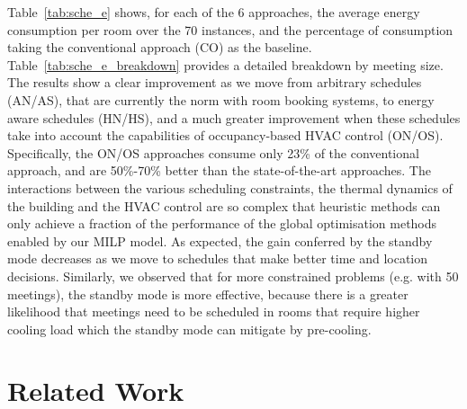 Table~\ref{tab:sche_e} shows, for each of the 6 approaches, the average energy consumption per room over the 70 instances, and the percentage of consumption taking the conventional approach (CO) as the baseline. Table~\ref{tab:sche_e_breakdown} provides a detailed breakdown by meeting size. The results show a clear improvement as we move from arbitrary schedules (AN/AS), that are currently the norm with room booking systems, to energy aware schedules (HN/HS), and a much greater improvement when these  schedules take into account the capabilities of occupancy-based HVAC control (ON/OS). Specifically, the ON/OS approaches consume only 23\% of the conventional approach, and are 50\%-70\% better than the state-of-the-art approaches. The interactions between the various scheduling constraints, the thermal dynamics of the building and the HVAC control are so complex that heuristic methods can only achieve a fraction  of the performance of the global optimisation methods enabled by our MILP model.  As expected, the gain conferred by the standby mode  decreases as we move to schedules that make better time and location decisions. Similarly, we observed that for more constrained problems (e.g. with 50 meetings), the standby mode is more effective, because there is a greater likelihood that meetings need to be scheduled in rooms that require higher cooling load which the standby mode can mitigate by pre-cooling.


\section{Related Work}
\label{sec:mip:related}

